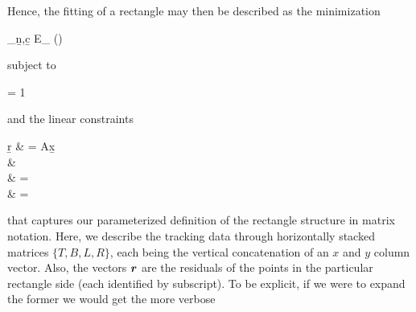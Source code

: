 Hence, the fitting of a rectangle may then be described as the minimization 
\begin{eqRef}\label{eq:of}
	\arg \min_{\b{n},\b{c}} E_{} (\cdots) %
\end{eqRef}
subject to 
\begin{eqRef}\label{eq:quadConstr}
	 = 1
\end{eqRef}
and the linear constraints 
\begin{eqRef}\label{eq:systemConstr}
	 \b{r}	 & = A\b{x}
	\\  & \uda  \\ 
	& = 
\\
	& = 
\end{eqRef}
that captures our parameterized definition of the rectangle structure in matrix notation. Here, we describe the tracking data through horizontally stacked matrices $\{T,B,L,R\}$, each being the vertical concatenation of an $x$ and $y$ column vector. Also, the vectors $\boldsymbol{r}$ are the residuals of the points in the particular rectangle side (each identified by  subscript). To be explicit, if  we were to expand the former we would get the more verbose

